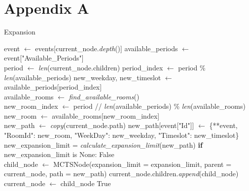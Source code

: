 
\chapter*{Appendix A} %

\label{AppendixA} %

\begin{algorithm}
\caption{Expansion}\label{expansion}
\begin{algorithmic}[1]
    \State event $\gets$ events[current\_node.\textit{depth}()]
    \State available\_periods $\gets$ event["Available\_Periods"]
    \\
    \State period $\gets$ \textit{len}(current\_node.children)
    \State period\_index $\gets$ period \% \textit{len}(available\_periods)
    \State new\_weekday, new\_timeslot $\gets$ available\_periods[period\_index]
    \\
    \State available\_rooms $\gets$ \textit{find\_available\_rooms}()
    \\
    \State new\_room\_index $\gets$ period // \textit{len}(available\_periods) \% \textit{len}(available\_rooms)
    \State new\_room $\gets$ available\_rooms[new\_room\_index]
    \\
    \State new\_path $\gets$ \textit{copy}(current\_node.path)
    \State new\_path[event["Id"]] $\gets$ \{**event, "RoomId": new\_room, "WeekDay": new\_weekday, "Timeslot": new\_timeslot\}
    \\
    \State new\_expansion\_limit = \textit{calculate\_expansion\_limit}(new\_path)
    \State \textbf{if} new\_expansion\_limit is None: \Return False
    \\
    \State child\_node $\gets$ MCTSNode(expansion\_limit = expansion\_limit, parent = current\_node, path = new\_path)
    \State current\_node.children.\textit{append}(child\_node)
    \State current\_node $\gets$ child\_node
    \State \Return True
\EndProcedure
\end{algorithmic}
\end{algorithm}


